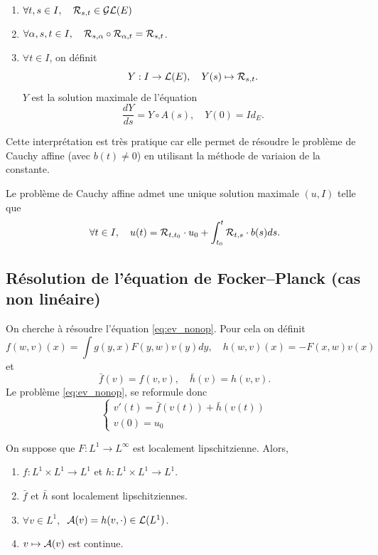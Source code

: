 \begin{prop}{}{}
	\begin{enumerate}
		\item $\forall t,s \in I, \quad \mathcal{R}_{s,t} \in \mathcal{G}\mathcal{L}(E)$
		\item $\forall \alpha, s, t \in I, \quad \mathcal{R}_{s,\alpha} \circ \mathcal{R}_{\alpha, t} = \mathcal{R}_{s,t}$.
		\item $\forall t \in I$, on définit
		      \[
			      Y : I \to \mathcal{L}(E), \quad Y(s) \mapsto \mathcal{R}_{s,t}.
		      \]
		      $Y$ est la solution maximale de l'équation
		      \[
			      \frac{dY}{ds} = Y \circ A(s), \quad Y(0) = Id_E.
		      \]
	\end{enumerate}
\end{prop}

Cette interprétation est très pratique car elle permet de résoudre le problème de Cauchy affine (avec $b(t) \neq 0$) en utilisant la méthode
de variaion de la constante.

\begin{prop}{}{}
	Le problème de Cauchy affine admet une unique solution maximale $(u, I)$ telle que
	\[
		\forall t \in I, \quad u(t) = \mathcal{R}_{t,t_0} \cdot u_0 + \int_{t_0}^t \mathcal{R}_{t,s}\cdot b(s) ds.
	\]
\end{prop}

\subsection{Résolution de l'équation de Focker--Planck (cas non linéaire)}

On cherche à résoudre l'équation \ref{eq:ev_nonop}. Pour cela on définit
\[
	f(w,v)(x) = \int g(y,x) F(y,w) v(y) dy, \quad h(w,v)(x) = -F(x,w)v(x)
\]
et
\[
	\bar{f}(v) = f(v,v), \quad \bar{h}(v) = h(v,v).
\]
Le problème \ref{eq:ev_nonop}, se reformule donc
\begin{equation}
	\begin{cases}
		v'(t) = \bar{f}(v(t)) + \bar{h}(v(t)) \\
		v(0) = u_0
	\end{cases}
	\label{eq:ev_new}
\end{equation}

\begin{prop}{}{}
	On suppose que $F : L^1 \to L^\infty$ est localement lipschitzienne. Alors,
	\begin{enumerate}
		\item $f : L^1 \times L^1 \to L^1$ et $h : L^1 \times L^1 \to L^1$.
		\item $\bar f$ et $\bar h$ sont localement lipschitziennes.
		\item $\forall v \in L^1, \ $ $\mathcal{A}(v) = h(v, \cdot) \in \mathcal{L}(L^1)$.
		\item $v \mapsto \mathcal{A}(v)$ est continue.
	\end{enumerate}
\end{prop}

